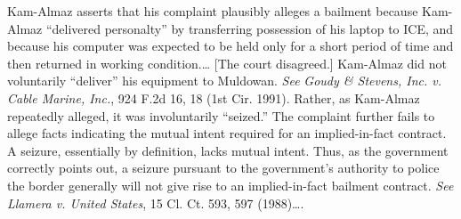 Kam-Almaz asserts that his complaint
plausibly alleges a bailment because Kam-Almaz ``delivered personalty'' by
transferring possession of his laptop to ICE, and because his computer was
expected to be held only for a short period of time and then returned in working
condition.\ldots
%
%
[The court disagreed.] Kam-Almaz did not
voluntarily ``deliver'' his equipment to Muldowan. \textit{See} \textit{Goudy \&
Stevens, Inc. v. Cable Marine, Inc.}, 924 F.2d 16, 18 (1st Cir. 1991). Rather,
as Kam-Almaz repeatedly alleged, it was involuntarily ``seized.''
The complaint further fails to
allege facts indicating the mutual intent required for an implied-in-fact
contract. A seizure, essentially by definition, lacks mutual intent. Thus, as
the government correctly points out, a seizure pursuant to the government's
authority to police the border generally will not give rise to an
implied-in-fact bailment contract.
\textit{See} \textit{Llamera v. United
States}, 15 Cl. Ct. 593, 597 (1988)\ldots.
